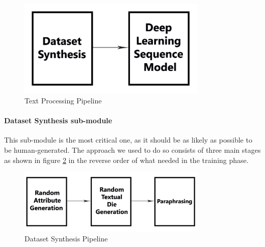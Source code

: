 \begin{figure}[H]
        \centering
        \includegraphics[width=0.8\textwidth]{images/text-processing-submodule.png}
        \caption{Text Processing Pipeline}
        \label{fig:text_processing_pipeline}
    \end{figure}

\paragraph{Dataset Synthesis sub-module}
This sub-module is the most critical one, as it should be as likely as possible to be human-generated. The approach we used to do so consists of three main stages as shown in figure \ref{fig:dataset_syn} in the reverse order of what needed in the training phase.

\begin{figure}[H]
        \centering
        \includegraphics[width=0.8\textwidth]{images/data-synthesis.png}
        \caption{Dataset Synthesis Pipeline}
        \label{fig:dataset_syn}
    \end{figure}

